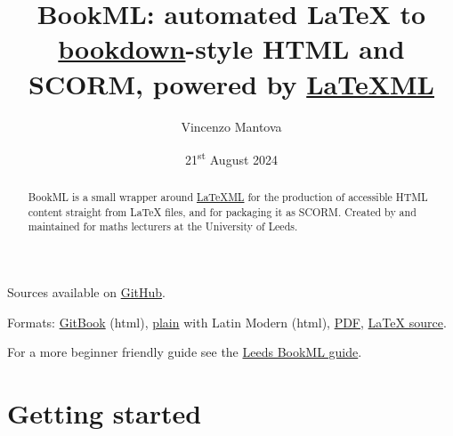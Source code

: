 \documentclass[a4paper,british]{article}
\title{BookML\@: automated LaTeX to \href{https://bookdown.org/yihui/bookdown/html.html\#gitbook-style}{bookdown}-style HTML and SCORM, powered by \href{https://dlmf.nist.gov/LaTeXML/}{LaTeXML}}
\author{Vincenzo Mantova}
\date{21\textsuperscript{st} August 2024}
\begin{document}
\maketitle

\begin{abstract}
  BookML is a small wrapper around \href{https://dlmf.nist.gov/LaTeXML/}{LaTeXML} for the production of accessible HTML content straight from LaTeX files, and for packaging it as SCORM\@. Created by and maintained for maths lecturers at the University of Leeds.
\end{abstract}

\begin{center}
  Sources available on \href{https://github.com/vlmantova/bookml/}{GitHub}.

  Formats: \href{https://vlmantova.github.io/bookml/}{GitBook} (html), \href{https://vlmantova.github.io/bookml/index.plain.html}{plain} with Latin Modern (html), \href{https://vlmantova.github.io/bookml/docs.pdf}{PDF}, \href{https://github.com/vlmantova/bookml/blob/docs/docs.tex}{\LaTeX{} source}.

  For a more beginner friendly guide see the \href{https://vlmantova.github.io/bookmlleeds/}{Leeds BookML guide}.
\end{center}

\tableofcontents

\section{Getting started}
\end{document}

